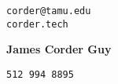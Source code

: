 \documentclass[12pt]{article}
\begin{document}

\noindent
\begin{minipage}{0.2\linewidth}
    \begin{flushleft}
        \verb|corder@tamu.edu|\\
        \verb|corder.tech| \\
    \end{flushleft}
\end{minipage}
\hfill
\begin{minipage}{0.5\linewidth}
    \begin{center}
        {\Huge\textbf{James Corder Guy}}
    \end{center}
\end{minipage}
\hfill
\begin{minipage}{0.2\linewidth}
    \begin{flushright}
        \verb|512 994 8895|\\
    \end{flushright}
\end{minipage}

\end{document}
